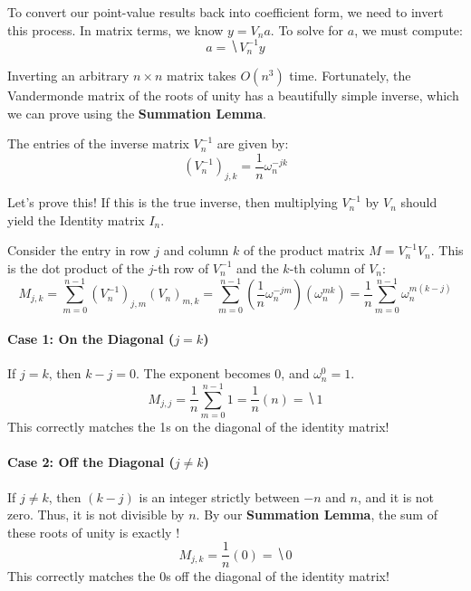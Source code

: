 \documentclass[11  pt]{article}
\begin{document}
To convert our point-value results back into coefficient form, we need to invert this process. In matrix terms, we know $y = V_n a$. To solve for $a$, we must compute:
\begin{equation*}
    a = \hide{V_n^{-1} y}
\end{equation*}

Inverting an arbitrary $n \times n$ matrix takes $O(n^3)$ time. Fortunately, the Vandermonde matrix of the roots of unity has a beautifully simple inverse, which we can prove using the \textbf{Summation Lemma}.

\begin{theorem}
The entries of the inverse matrix $V_n^{-1}$ are given by:
\begin{equation*}
    (V_n^{-1})_{j,k} = \frac{1}{n} \omega_n^{-jk}
\end{equation*}
\end{theorem}

\vs{0.5cm}
Let's prove this! If this is the true inverse, then multiplying $V_n^{-1}$ by $V_n$ should yield the Identity matrix $I_n$. 

Consider the entry in row $j$ and column $k$ of the product matrix $M = V_n^{-1} V_n$. This is the dot product of the $j$-th row of $V_n^{-1}$ and the $k$-th column of $V_n$:
\begin{equation*}
    M_{j,k} = \sum_{m=0}^{n-1} (V_n^{-1})_{j,m} (V_n)_{m,k} 
    = \sum_{m=0}^{n-1} \left( \frac{1}{n} \omega_n^{-jm} \right) \left( \omega_n^{mk} \right) 
    = \frac{1}{n} \sum_{m=0}^{n-1} \omega_n^{m(k-j)}
\end{equation*}

\vs{0.5cm}

\paragraph{Case 1: On the Diagonal ($j = k$)}
If $j=k$, then $k-j = 0$. The exponent becomes $0$, and $\omega_n^0 = 1$.
\begin{equation*}
    M_{j,j} = \frac{1}{n} \sum_{m=0}^{n-1} 1 = \frac{1}{n} (n) = \hide{1}
\end{equation*}
This correctly matches the 1s on the diagonal of the identity matrix!

\vs{0.5cm}

\paragraph{Case 2: Off the Diagonal ($j \neq k$)}
If $j \neq k$, then $(k-j)$ is an integer strictly between $-n$ and $n$, and it is not zero. Thus, it is not divisible by $n$.
By our \textbf{Summation Lemma}, the sum of these roots of unity is exactly ! 
\begin{equation*}
    M_{j,k} = \frac{1}{n} (0) = \hide{0}
\end{equation*}
This correctly matches the 0s off the diagonal of the identity matrix! 
\end{document}
